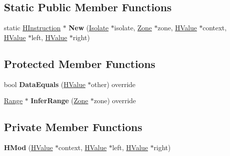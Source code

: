 \subsection*{Static Public Member Functions}
\begin{DoxyCompactItemize}
\item 
static \hyperlink{classv8_1_1internal_1_1_h_instruction}{H\+Instruction} $\ast$ {\bfseries New} (\hyperlink{classv8_1_1internal_1_1_isolate}{Isolate} $\ast$isolate, \hyperlink{classv8_1_1internal_1_1_zone}{Zone} $\ast$zone, \hyperlink{classv8_1_1internal_1_1_h_value}{H\+Value} $\ast$context, \hyperlink{classv8_1_1internal_1_1_h_value}{H\+Value} $\ast$left, \hyperlink{classv8_1_1internal_1_1_h_value}{H\+Value} $\ast$right)\hypertarget{classv8_1_1internal_1_1_h_mod_a1387932dcda154008032c7f2bac25935}{}\label{classv8_1_1internal_1_1_h_mod_a1387932dcda154008032c7f2bac25935}

\end{DoxyCompactItemize}
\subsection*{Protected Member Functions}
\begin{DoxyCompactItemize}
\item 
bool {\bfseries Data\+Equals} (\hyperlink{classv8_1_1internal_1_1_h_value}{H\+Value} $\ast$other) override\hypertarget{classv8_1_1internal_1_1_h_mod_ad8012b4800374554a61b445b0ecd2474}{}\label{classv8_1_1internal_1_1_h_mod_ad8012b4800374554a61b445b0ecd2474}

\item 
\hyperlink{classv8_1_1internal_1_1_range}{Range} $\ast$ {\bfseries Infer\+Range} (\hyperlink{classv8_1_1internal_1_1_zone}{Zone} $\ast$zone) override\hypertarget{classv8_1_1internal_1_1_h_mod_ad8507355bbb474022370ec8511f83513}{}\label{classv8_1_1internal_1_1_h_mod_ad8507355bbb474022370ec8511f83513}

\end{DoxyCompactItemize}
\subsection*{Private Member Functions}
\begin{DoxyCompactItemize}
\item 
{\bfseries H\+Mod} (\hyperlink{classv8_1_1internal_1_1_h_value}{H\+Value} $\ast$context, \hyperlink{classv8_1_1internal_1_1_h_value}{H\+Value} $\ast$left, \hyperlink{classv8_1_1internal_1_1_h_value}{H\+Value} $\ast$right)\hypertarget{classv8_1_1internal_1_1_h_mod_a218df8bc4de46121c64fa841f049abd6}{}\label{classv8_1_1internal_1_1_h_mod_a218df8bc4de46121c64fa841f049abd6}

\end{DoxyCompactItemize}
